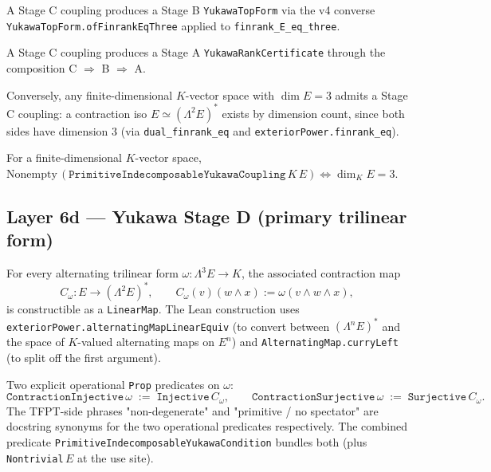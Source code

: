 \begin{theorem}
A Stage C coupling produces a Stage B
\texttt{YukawaTopForm} via the v4 converse
\texttt{YukawaTopForm.ofFinrankEqThree} applied to
\texttt{finrank\_E\_eq\_three}.
\end{theorem}

\begin{theorem}
A Stage C coupling produces a Stage A \texttt{YukawaRankCertificate}
through the composition C $\Rightarrow$ B $\Rightarrow$ A.
\end{theorem}

\begin{theorem}
Conversely, any finite-dimensional $K$-vector space with
$\dim E = 3$ admits a Stage C coupling: a contraction iso
$E \simeq (\Lambda^2 E)^*$ exists by dimension count, since both
sides have dimension $3$ (via
\texttt{dual\_finrank\_eq} and \texttt{exteriorPower.finrank\_eq}).
\end{theorem}

\begin{theorem}
For a finite-dimensional $K$-vector space,
$\text{Nonempty}\,(\texttt{PrimitiveIndecomposableYukawaCoupling}\,K\,E) \iff \dim_K E = 3$.
\end{theorem}

\subsection*{Layer 6d --- Yukawa Stage D (primary trilinear form)}

\begin{theorem}
For every alternating trilinear form
$\omega : \Lambda^3 E \to K$, the associated contraction map
\[
C_\omega : E \to (\Lambda^2 E)^*,
\qquad
C_\omega(v)(w \wedge x) := \omega(v \wedge w \wedge x),
\]
is constructible as a \texttt{LinearMap}. The Lean construction
uses \texttt{exteriorPower.alternatingMapLinearEquiv} (to
convert between $(\Lambda^n E)^*$ and the space of $K$-valued
alternating maps on $E^n$) and \texttt{AlternatingMap.curryLeft}
(to split off the first argument).
\end{theorem}

\begin{theorem}
Two explicit operational \texttt{Prop} predicates on $\omega$:
\[
\texttt{ContractionInjective}\,\omega \;:=\; \texttt{Injective}\,C_\omega,
\qquad
\texttt{ContractionSurjective}\,\omega \;:=\; \texttt{Surjective}\,C_\omega.
\]
The TFPT-side phrases "non-degenerate" and "primitive / no
spectator" are docstring synonyms for the two operational
predicates respectively. The combined predicate
\texttt{PrimitiveIndecomposableYukawaCondition} bundles both
(plus \texttt{Nontrivial}\,$E$ at the use site).
\end{theorem}

